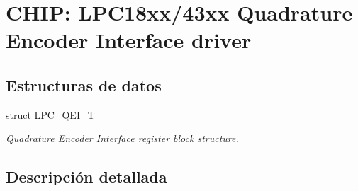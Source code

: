 \hypertarget{group___q_e_i__18_x_x__43_x_x}{}\section{C\+H\+IP\+: L\+P\+C18xx/43xx Quadrature Encoder Interface driver}
\label{group___q_e_i__18_x_x__43_x_x}
\subsection*{Estructuras de datos}
\begin{DoxyCompactItemize}
\item 
struct \hyperlink{struct_l_p_c___q_e_i___t}{L\+P\+C\+\_\+\+Q\+E\+I\+\_\+T}
\begin{DoxyCompactList}\small\item\em Quadrature Encoder Interface register block structure. \end{DoxyCompactList}\end{DoxyCompactItemize}


\subsection{Descripción detallada}
